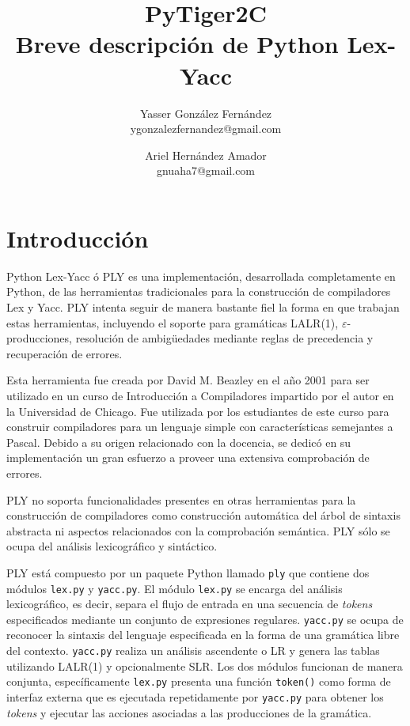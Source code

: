 \documentclass{article}
\title{
	\LARGE{PyTiger2C} \\
	\Large{Breve descripción de Python Lex-Yacc}
}
\author{
  	Yasser González Fernández \\
  	\small{ygonzalezfernandez@gmail.com}
  	\and
  	Ariel Hernández Amador \\
  	\small{gnuaha7@gmail.com}
}
\date{}
\begin{document}
\maketitle

\thispagestyle{empty}

\newpage

\setcounter{page}{1}

\section{Introducción}

Python Lex-Yacc ó PLY es una implementación, desarrollada completamente en
Python, de las herramientas tradicionales para la construcción de compiladores
Lex y Yacc. PLY intenta seguir de manera bastante fiel la forma en que
trabajan estas herramientas, incluyendo el soporte para gramáticas LALR(1),
$\varepsilon$-producciones, resolución de ambigüedades mediante reglas de
precedencia y recuperación de errores.

Esta herramienta fue creada por David M. Beazley en el año 2001 para ser
utilizado en un curso de Introducción a Compiladores impartido por el autor en
la Universidad de Chicago. Fue utilizada por los estudiantes de este curso
para construir compiladores para un lenguaje simple con características
semejantes a Pascal. Debido a su origen relacionado con la docencia, se dedicó
en su implementación un gran esfuerzo a proveer una extensiva comprobación de
errores.

PLY no soporta funcionalidades presentes en otras herramientas para la
construcción de compiladores como construcción automática del árbol de sintaxis
abstracta ni aspectos relacionados con la comprobación semántica. PLY sólo se
ocupa del análisis lexicográfico y sintáctico.

PLY está compuesto por un paquete Python llamado \texttt{ply} que contiene
dos módulos \texttt{lex.py} y \texttt{yacc.py}. El módulo \texttt{lex.py} se
encarga del análisis lexicográfico, es decir, separa el flujo de entrada en una
secuencia de \textit{tokens} especificados mediante un conjunto de expresiones
regulares. \texttt{yacc.py} se ocupa de reconocer la sintaxis del lenguaje
especificada en la forma de una gramática libre del contexto. \texttt{yacc.py}
realiza un análisis ascendente o LR y genera las tablas utilizando LALR(1) y
opcionalmente SLR. Los dos módulos funcionan de manera conjunta, específicamente
\texttt{lex.py} presenta una función \texttt{token()} como forma de interfaz
externa que es  ejecutada repetidamente por \texttt{yacc.py} para obtener los
\textit{tokens} y  ejecutar las acciones asociadas a las producciones de la
gramática.
\end{document}
